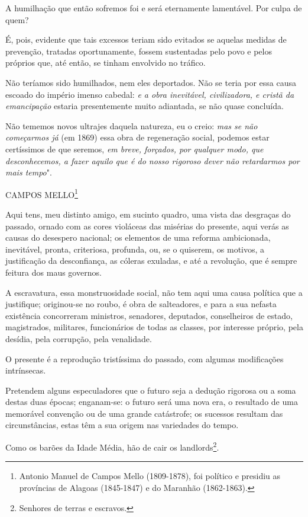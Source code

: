 A humilhação que então sofremos foi e será eternamente lamentável. Por
culpa de quem?

É, pois, evidente que tais excessos teriam sido evitados se aquelas
medidas de prevenção, tratadas oportunamente, fossem sustentadas pelo
povo e pelos próprios que, até então, se tinham envolvido no tráfico.

Não teríamos sido humilhados, nem eles deportados. Não se teria por essa
causa escoado do império imenso cabedal: \emph{e a obra inevitável,
civilizadora, e cristã da emancipação} estaria presentemente muito
adiantada, se não quase concluída.

Não tememos novos ultrajes daquela natureza, eu o creio: \emph{mas se
não começarmos já} (em 1869) essa obra de regeneração social, podemos
estar certíssimos de que seremos, \emph{em breve, forçados, por qualquer
modo, que desconhecemos, a fazer aquilo que é do nosso rigoroso dever
não retardarmos por mais tempo}".

CAMPOS MELLO\footnote{Antonio Manuel de Campos Mello (1809-1878), foi
  político e presidiu as províncias de Alagoas (1845-1847) e do Maranhão
  (1862-1863).}

Aqui tens, meu distinto amigo, em sucinto quadro, uma vista das
desgraças do passado, ornado com as cores violáceas das misérias do
presente, aqui verás as causas do desespero nacional; os elementos de
uma reforma ambicionada, inevitável, pronta, criteriosa, profunda, ou,
se o quiserem, os motivos, a justificação da desconfiança, as cóleras
exuladas, e até a revolução, que é sempre feitura dos maus governos.

A escravatura, essa monstruosidade social, não tem aqui uma causa
política que a justifique; originou-se no roubo, é obra de salteadores,
e para a sua nefasta existência concorreram ministros, senadores,
deputados, conselheiros de estado, magistrados, militares, funcionários
de todas as classes, por interesse próprio, pela desídia, pela
corrupção, pela venalidade.

O presente é a reprodução tristíssima do passado, com algumas
modificações intrínsecas.

Pretendem alguns especuladores que o futuro seja a dedução rigorosa ou a
soma destas duas épocas; enganam-se: o futuro será uma nova era, o
resultado de uma memorável convenção ou de uma grande catástrofe; os
sucessos resultam das circunstâncias, estas têm a sua origem nas
variedades do tempo.

Como os barões da Idade Média, hão de cair os landlords\footnote{
  Senhores de terras e escravos.}.

